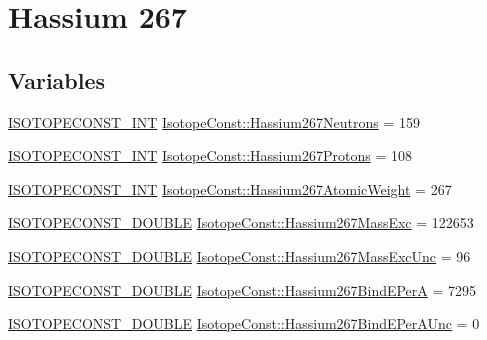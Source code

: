 \hypertarget{group___isotope_const-_hassium-_hs267}{}\section{Hassium 267}
\label{group___isotope_const-_hassium-_hs267}
\subsection*{Variables}
\begin{DoxyCompactItemize}
\item 
\mbox{\hyperlink{group___isotope_const-_macros_ga5f18360b3e99483a35c32d789e62621c}{I\+S\+O\+T\+O\+P\+E\+C\+O\+N\+S\+T\+\_\+\+I\+NT}} \mbox{\hyperlink{group___isotope_const-_hassium-_hs267_ga65abe508e786b7d7a4ad4327f725dcad}{Isotope\+Const\+::\+Hassium267\+Neutrons}} = 159
\item 
\mbox{\hyperlink{group___isotope_const-_macros_ga5f18360b3e99483a35c32d789e62621c}{I\+S\+O\+T\+O\+P\+E\+C\+O\+N\+S\+T\+\_\+\+I\+NT}} \mbox{\hyperlink{group___isotope_const-_hassium-_hs267_gaf7d214158875da7b1c4db3eb0be34f28}{Isotope\+Const\+::\+Hassium267\+Protons}} = 108
\item 
\mbox{\hyperlink{group___isotope_const-_macros_ga5f18360b3e99483a35c32d789e62621c}{I\+S\+O\+T\+O\+P\+E\+C\+O\+N\+S\+T\+\_\+\+I\+NT}} \mbox{\hyperlink{group___isotope_const-_hassium-_hs267_ga9fd97051fce1b83e81818caf479d4a43}{Isotope\+Const\+::\+Hassium267\+Atomic\+Weight}} = 267
\item 
\mbox{\hyperlink{group___isotope_const-_macros_ga8f45a7272ce02c0b4c65c44636ed719a}{I\+S\+O\+T\+O\+P\+E\+C\+O\+N\+S\+T\+\_\+\+D\+O\+U\+B\+LE}} \mbox{\hyperlink{group___isotope_const-_hassium-_hs267_gacfa1c1a85d65d72b7754dbb3d035d63e}{Isotope\+Const\+::\+Hassium267\+Mass\+Exc}} = 122653
\item 
\mbox{\hyperlink{group___isotope_const-_macros_ga8f45a7272ce02c0b4c65c44636ed719a}{I\+S\+O\+T\+O\+P\+E\+C\+O\+N\+S\+T\+\_\+\+D\+O\+U\+B\+LE}} \mbox{\hyperlink{group___isotope_const-_hassium-_hs267_ga3da7c0b47b3f16589bdd9632795a4db1}{Isotope\+Const\+::\+Hassium267\+Mass\+Exc\+Unc}} = 96
\item 
\mbox{\hyperlink{group___isotope_const-_macros_ga8f45a7272ce02c0b4c65c44636ed719a}{I\+S\+O\+T\+O\+P\+E\+C\+O\+N\+S\+T\+\_\+\+D\+O\+U\+B\+LE}} \mbox{\hyperlink{group___isotope_const-_hassium-_hs267_ga39102623f5e80fd449155f66888999de}{Isotope\+Const\+::\+Hassium267\+Bind\+E\+PerA}} = 7295
\item 
\mbox{\hyperlink{group___isotope_const-_macros_ga8f45a7272ce02c0b4c65c44636ed719a}{I\+S\+O\+T\+O\+P\+E\+C\+O\+N\+S\+T\+\_\+\+D\+O\+U\+B\+LE}} \mbox{\hyperlink{group___isotope_const-_hassium-_hs267_ga3af67fba00c0498549e1b9245f76b3a4}{Isotope\+Const\+::\+Hassium267\+Bind\+E\+Per\+A\+Unc}} = 0

\end{DoxyCompactItemize}
